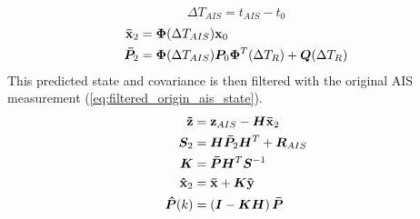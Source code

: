 \begin{equation}\label{eq:ais_time_delta}
\Delta T_{AIS} = t_{AIS} - t_{0}
\end{equation}
\begin{equation}\label{eq:predicted_origin_state_ais_time}
\begin{split}
\boldsymbol{\mathbf{\bar{x}}}_2 	&= \bm{\Phi}(\Delta T_{AIS}) \boldsymbol{\mathbf{x}}_0 \\
\bm{\bar{P}}_2	&= \bm{\Phi}(\Delta T_{AIS}) \bm{P}_0  \bm{\Phi}^T(\Delta T_R) + \bm{Q}(\Delta T_R) \\
\end{split}
\end{equation}
This predicted state and covariance is then filtered with the original AIS measurement (\ref{eq:filtered_origin_ais_state}).
\begin{equation}\label{eq:filtered_origin_ais_state}
\begin{split}
\boldsymbol{\mathbf{\tilde{z}}}	&= \boldsymbol{\mathbf{z}}_{AIS} - \bm{H} \boldsymbol{\mathbf{\bar{x}}}_2 \\
\bm{S}_2			&= \bm{H} \bm{\bar{P}}_2 \bm{H}^T + \bm{R}_{AIS} \\
\bm{K} 			&= \bm{\bar{P}} \bm{H}^T \bm{S}^{-1} \\
\boldsymbol{\mathbf{\hat{x}}}_2 	&= \boldsymbol{\mathbf{\bar{x}}} + \bm{K} \boldsymbol{\mathbf{\tilde{y}}} \\
\bm{\hat{P}}(k) 	&= \left( \bm{I} - \bm{K} \bm{H} \right) \bm{\bar{P}}
\end{split}
\end{equation}



